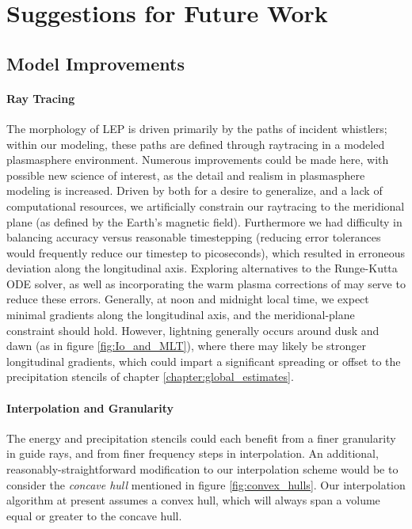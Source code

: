 \section{Suggestions for Future Work}

\subsection{Model Improvements}
\paragraph{Ray Tracing}
The morphology of LEP is driven primarily by the paths of incident whistlers; within our modeling, these paths are defined through raytracing in a modeled plasmasphere environment. Numerous improvements could be made here, with possible new science of interest, as the detail and realism in plasmasphere modeling is increased. Driven by both for a desire to generalize, and a lack of computational resources, we artificially constrain our raytracing to the meridional plane (as defined by the Earth's magnetic field). Furthermore we had difficulty in balancing accuracy versus reasonable timestepping (reducing error tolerances would frequently reduce our timestep to picoseconds), which resulted in erroneous deviation along the longitudinal axis. Exploring alternatives to the Runge-Kutta ODE solver, as well as incorporating the warm plasma corrections of 
\cite{Maxworth2017} may serve to reduce these errors.
Generally, at noon and midnight local time, we expect minimal gradients along the longitudinal axis, and the meridional-plane constraint should hold. However, lightning generally occurs around dusk and dawn (as in figure \ref{fig:Io_and_MLT}), where there may likely be stronger longitudinal gradients, which could impart a significant spreading or offset to the precipitation stencils of chapter \ref{chapter:global_estimates}. %

\paragraph{Interpolation and Granularity}
The energy and precipitation stencils could each benefit from a finer granularity in guide rays, and from finer frequency steps in interpolation. An additional, reasonably-straightforward modification to our interpolation scheme would be to consider the \emph{concave hull} mentioned in figure \ref{fig:convex_hulls}. Our interpolation algorithm at present assumes a convex hull, which will always span a volume equal or greater to the concave hull.

